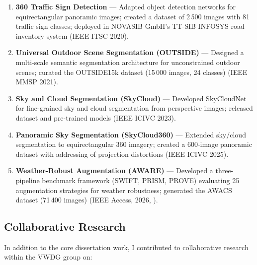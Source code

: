 \documentclass[11pt,a4paper]{article}
\begin{document}
\begin{enumerate}[nosep, leftmargin=1.5em, itemsep=4pt]
  \item \textbf{360\textdegree{} Traffic Sign Detection} --- Adapted object detection networks
    for equirectangular panoramic images; created a dataset of 2\,500 images with
    81 traffic sign classes; deployed in NOVASIB GmbH's TT-SIB INFOSYS\textregistered{} road
    inventory system (IEEE ITSC 2020).

  \item \textbf{Universal Outdoor Scene Segmentation (OUTSIDE)} --- Designed a multi-scale
    semantic segmentation architecture for unconstrained outdoor scenes; curated the
    OUTSIDE15k dataset (15\,000 images, 24 classes) (IEEE MMSP 2021).

  \item \textbf{Sky and Cloud Segmentation (SkyCloud)} --- Developed SkyCloudNet for
    fine-grained sky and cloud segmentation from perspective images; released dataset
    and pre-trained models (IEEE ICIVC 2023).

  \item \textbf{Panoramic Sky Segmentation (SkyCloud360)} --- Extended sky/cloud
    segmentation to equirectangular 360\textdegree{} imagery; created a 600-image panoramic
    dataset with addressing of projection distortions (IEEE ICIVC 2025).

  \item \textbf{Weather-Robust Augmentation (AWARE)} --- Developed a three-pipeline
    benchmark framework (SWIFT, PRISM, PROVE) evaluating 25 augmentation strategies
    for weather robustness; generated the AWACS dataset (71\,400 images)
    (IEEE Access, 2026, ).
\end{enumerate}

\subsection*{Collaborative Research}

\noindent
In addition to the core dissertation work, I contributed to collaborative research
within the VWDG group on:
\end{document}
